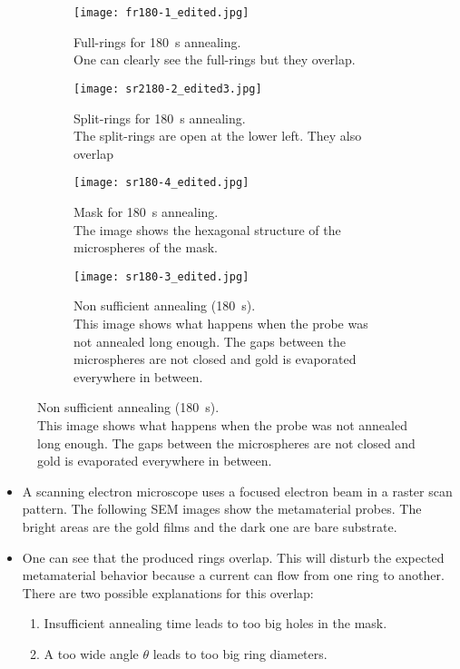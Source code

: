\captionsetup{
    singlelinecheck=false,
    justification=justified
    }
\begin{figure}[htbp]
\begin{subfigure}[t][][t]{0.48\textwidth}
    \texttt{[image: fr180-1\_edited.jpg]}
    \caption[justification=raggedright]{
        Full-rings for \SI{180}{\second} annealing.\\
        One can clearly see the full-rings but they overlap.
        }
    \label{fig:sem-fr1}
\end{subfigure}
\hfill
\begin{subfigure}[t][][t]{0.48\textwidth}
    \texttt{[image: sr2180-2\_edited3.jpg]}
    \caption{
        Split-rings for \SI{180}{\second} annealing.\\
        The split-rings are open at the lower left.
        They also overlap
    }
    \label{fig:sem-sr1}
\end{subfigure}

\begin{subfigure}[t][][t]{0.48\textwidth}
    \texttt{[image: sr180-4\_edited.jpg]}
    \caption{
        Mask for \SI{180}{\second} annealing.\\
        The image shows the hexagonal structure of the microspheres of the mask.
    }
    \label{fig:sem-mask}
\end{subfigure}
\hfill
\begin{subfigure}[t][][t]{0.48\textwidth}
    \texttt{[image: sr180-3\_edited.jpg]}
    \caption{
        Non sufficient annealing (\SI{180}{\second}).\\
        This image shows what happens when the probe was not annealed long enough.
        The gaps between the microspheres are not closed and gold is evaporated everywhere in between.
    }
    \label{fig:sem-nsa}
\end{subfigure}
\end{figure}
\begin{itemize}
    \item A scanning electron microscope uses a focused electron beam in a raster scan pattern.
    The following SEM images show the metamaterial probes.
    The bright areas are the gold films and the dark one are bare substrate.
    \item One can see that the produced rings overlap.
    This will disturb the expected metamaterial behavior because a current can flow from one ring to another.
    There are two possible explanations for this overlap:
    \begin{enumerate}
        \item Insufficient annealing time leads to too big holes in the mask.
        \item A too wide angle $\theta$ leads to too big ring diameters.
    \end{enumerate}
\end{itemize}



